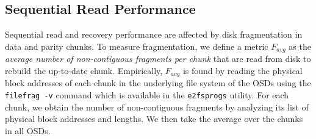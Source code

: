 %
%


\subsection{Sequential Read Performance} 
\label{eval:seq_read} 

Sequential read and recovery performance are affected by disk fragmentation in data and parity
chunks.  To measure fragmentation, we define a metric $F_{avg}$ as the 
\textit{average number of non-contiguous fragments per chunk} that are read
from disk to rebuild the up-to-date chunk.  Empirically, $F_{avg}$ is found by
reading the physical block addresses of each chunk in the underlying file
system of the OSDs using the \texttt{filefrag -v} command which is available
in the \texttt{e2fsprogs} utility. For each chunk, we obtain the number of
non-contiguous fragments by analyzing its list of physical block addresses and
lengths.  We then take the average over the chunks in all OSDs. 


